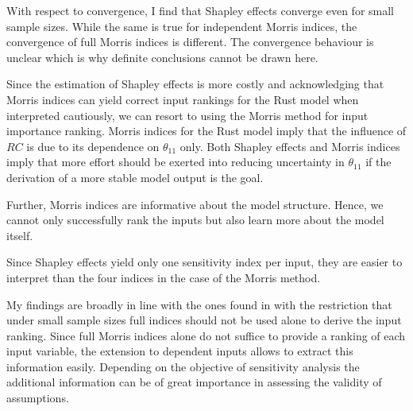 With respect to convergence, I find that Shapley effects converge even for small sample sizes. While the same is true for independent Morris indices, the convergence of full Morris indices is different. The convergence behaviour is unclear which is why definite conclusions cannot be drawn here.

Since the estimation of Shapley effects is more costly and acknowledging that Morris
indices can yield correct input rankings for the Rust model when interpreted cautiously, we can resort to using the Morris
method for input importance ranking. Morris indices for the Rust model imply that the influence of $RC$ is due to its dependence on $\theta_{11}$ only. Both Shapley effects and Morris indices imply that more effort should be exerted into reducing uncertainty in $\theta_{11}$ if the derivation of a more stable model output is the goal.

Further, Morris indices are informative about the model structure. Hence, we cannot only successfully rank the inputs but also learn more about the model itself.

Since Shapley effects yield only one sensitivity index per input, they are easier to interpret than the four indices in the case of the Morris method.

My findings are broadly in line with the ones found in \citet{GM17} with the restriction that under small sample sizes full indices should not be used alone to derive the input ranking. %
Since full Morris indices alone do not suffice to provide a ranking of each input variable, the extension to dependent inputs allows to extract this information easily. Depending on the objective of sensitivity analysis the additional information can be of great importance in assessing the validity of assumptions.